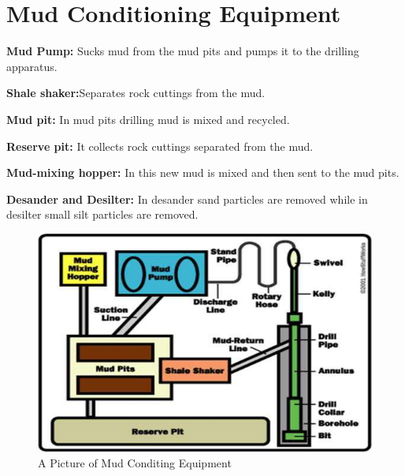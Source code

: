 \chapter{Mud Conditioning Equipment}

\textbf{Mud Pump:} Sucks mud from the mud pits and pumps it to the drilling apparatus.

\vspace{1em}

\textbf{Shale shaker:}Separates rock cuttings from the mud.

\vspace{1em}

\textbf{Mud pit:} In mud pits drilling mud is mixed and recycled. 

\vspace{1em}

\textbf{Reserve pit:} It collects rock cuttings separated from the mud.

\vspace{1em}

\textbf{Mud-mixing hopper:} In this new mud is mixed and then sent to the mud pits.

\vspace{1em}

\textbf{Desander and Desilter:} In desander sand particles are removed while in desilter small silt particles are removed.

\vspace{2em}

\begin{figure}[h]
\includegraphics[scale=0.6]{images/Mudconditingequipment}
\centering 
\caption{A Picture of Mud Conditing Equipment}
\end{figure}



